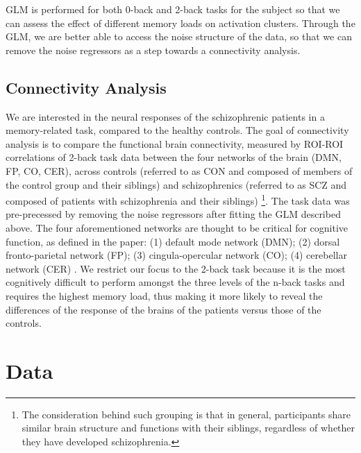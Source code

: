 \documentclass[11pt]{article}
\begin{document}
GLM is performed for both 0-back and 2-back tasks for the subject so that we can assess the effect of different memory loads on activation clusters. Through the GLM, we are better able to access the noise structure of the data, so that we can remove the noise regressors as a step towards a connectivity analysis. 

\subsection{Connectivity Analysis}

We are interested in the neural responses of the schizophrenic patients in a memory-related task, compared to the healthy controls. The goal of connectivity analysis is to compare the functional brain connectivity, measured by ROI-ROI correlations of 2-back task data between the four networks of the brain (DMN, FP, CO, CER), across controls (referred to as CON and composed of members of the control group and their siblings) and schizophrenics (referred to as SCZ and composed of patients with schizophrenia and their siblings) \footnote{The consideration behind such grouping is that in general, participants share similar brain structure and functions with their siblings, regardless of whether they have developed schizophrenia.}. The task data was pre-precessed by removing the noise regressors after fitting the GLM described above. The four aforementioned networks are thought to be critical for cognitive function, as defined in the paper: (1) default mode network (DMN); (2) dorsal fronto-parietal network (FP); (3) cingula-opercular network (CO); (4) cerebellar network (CER) \cite{repovs2012}. We restrict our focus to the 2-back task because it is the most cognitively difficult to perform amongst the three levels of the n-back tasks and requires the highest memory load, thus making it more likely to reveal the differences of the response of the brains of the patients versus those of the controls.

\section{Data}
\end{document}
